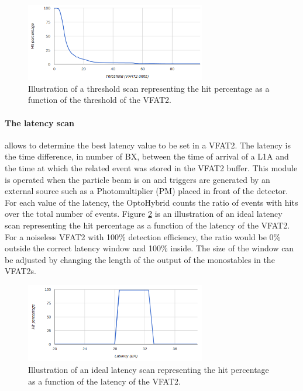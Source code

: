       \begin{figure}[h!]
        \centering
        \includegraphics[width=0.7\textwidth]{img/II-3-test-beam/threshold_scan.png}
        \caption{Illustration of a threshold scan representing the hit percentage as a function of the threshold of the VFAT2.}
        \label{fig:II-3-threshold-scan}
      \end{figure}

      \paragraph{The latency scan} allows to determine the best latency value to be set in a VFAT2. The latency is the time difference, in number of BX, between the time of arrival of a L1A and the time at which the related event was stored in the VFAT2 buffer. This module is operated when the particle beam is on and triggers are generated by an external source such as a Photomultiplier (PM) placed in front of the detector. For each value of the latency, the OptoHybrid counts the ratio of events with hits over the total number of events. Figure \ref{fig:II-3-latency-scan} is an illustration of an ideal latency scan representing the hit percentage as a function of the latency of the VFAT2. For a noiseless VFAT2 with 100\% detection efficiency, the ratio would be 0\% outside the correct latency window and 100\% inside. The size of the window can be adjusted by changing the length of the output of the monostables in the VFAT2s.

      \begin{figure}[h!]
        \centering
        \includegraphics[width=0.7\textwidth]{img/II-3-test-beam/latency_scan.png}
        \caption{Illustration of an ideal latency scan representing the hit percentage as a function of the latency of the VFAT2.}
        \label{fig:II-3-latency-scan}
      \end{figure}

